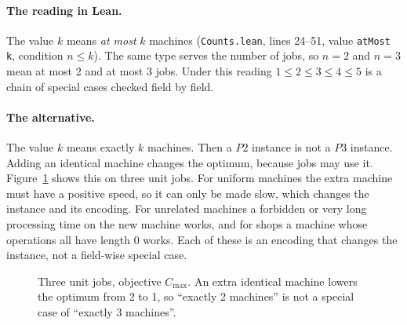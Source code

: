 \documentclass[11pt]{article}
\newcommand{\lean}[1]{\texttt{#1}}
\newcommand{\Cmax}{C_{\max}}
\theoremstyle{definition}
\newcommand{\gbar}[5]{\fill[#4] (#2,#1-0.35) rectangle (#3,#1+0.35);
  \draw (#2,#1-0.35) rectangle (#3,#1+0.35); \node at ({(#2+#3)/2},#1) {\small #5};}
\newcommand{\gaxis}[2]{\draw[->] (0,#1) -- (#2+0.4,#1);
  \foreach \t in {0,...,#2} \draw (\t,#1+0.08) -- (\t,#1-0.08) node[below] {\scriptsize \t};}
\begin{document}
\paragraph{The reading in Lean.} The value $k$ means \emph{at most} $k$ machines
(\lean{Counts.lean}, lines 24--51, value \lean{atMost k}, condition $n\le k$).
The same type serves the number of jobs, so $n=2$ and $n=3$ mean at most 2 and
at most 3 jobs. Under this reading $1 \le 2 \le 3 \le 4 \le 5$ is a chain of
special cases checked field by field.

\paragraph{The alternative.} The value $k$ means exactly $k$ machines. Then a
$P2$ instance is not a $P3$ instance. Adding an identical machine changes the
optimum, because jobs may use it. Figure~\ref{fig:p2p3} shows this on three
unit jobs. For uniform machines the extra machine must have a positive speed,
so it can only be made slow, which changes the instance and its encoding. For
unrelated machines a forbidden or very long processing time on the new
machine works, and for shops a machine whose operations all have length $0$
works. Each of these is an encoding that changes the instance, not a
field-wise special case.

\begin{figure}[ht]
\centering
{}
\caption{Three unit jobs, objective $\Cmax$. An extra identical machine
lowers the optimum from 2 to 1, so ``exactly 2 machines'' is not a special
case of ``exactly 3 machines''.}
\label{fig:p2p3}
\end{figure}
\end{document}

